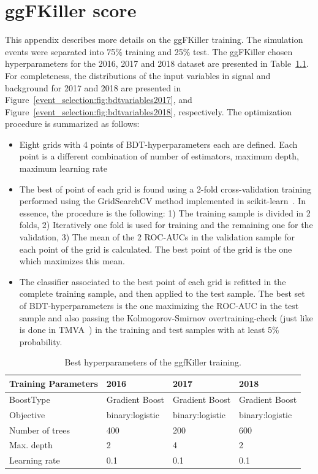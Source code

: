 \chapter{ggFKiller score}\label{appendix:ggfkiller}
This appendix describes more details on the ggFKiller training. The simulation events were separated into 75\% training and 25\% test. The ggFKiller chosen hyperparameters for the 2016, 2017 and 2018 dataset are presented in Table~\ref{event_selection:tab:ggfkillerconfig}. For completeness, the distributions of the input variables in signal and background for 2017 and 2018 are presented in Figure~\ref{event_selection:fig:bdtvariables2017}, and Figure~\ref{event_selection:fig:bdtvariables2018}, respectively. The optimization procedure is summarized as follows:
\begin{itemize}
	\setlength\itemsep{0.01em}
	\item Eight grids with 4 points of BDT-hyperparameters each are defined. Each point is a different combination of number of estimators, maximum depth, maximum learning rate
	\item The best of point of each grid is found using a 2-fold cross-validation training performed using the GridSearchCV method implemented in scikit-learn~\cite{scikitlearn}. In essence, the procedure is the following: 1) The training sample is divided in 2 folds, 2) Iteratively one fold is used for training and the remaining one for the validation, 3) The mean of the 2 ROC-AUCs in the validation sample for each point of the grid is calculated. The best point of the grid is the one which maximizes this mean.
\item The classifier associated to the best point of each grid is refitted in the complete training sample, and then applied to the test sample. The best set of BDT-hyperparameters is the one maximizing the ROC-AUC in the test sample and also passing the Kolmogorov-Smirnov overtraining-check (just like is done in TMVA~\cite{Hocker:2007ht}) in the training and test samples with at least 5\% probability. 
\end{itemize}

\begin{table}[htb!]
\caption[Best hyperparameters of the ggfkiller training]{\label{event_selection:tab:ggfkillerconfig}Best hyperparameters of the ggfKiller training.}
\centering
\begin{tabularx}{\textwidth}{l X X X }
	\hline
	Training Parameters   & 2016            & 2017           &           2018\\
	\hline
	BoostType             & Gradient Boost  & Gradient Boost & Gradient Boost\\
	Objective             & binary:logistic & binary:logistic&binary:logistic\\
	Number of trees       &           400   &           200  &            600\\
	Max. depth            &             2   &             4  &              2\\
	Learning rate         &           0.1   &           0.1  &            0.1\\
	\hline
\end{tabularx}
\end{table}	


